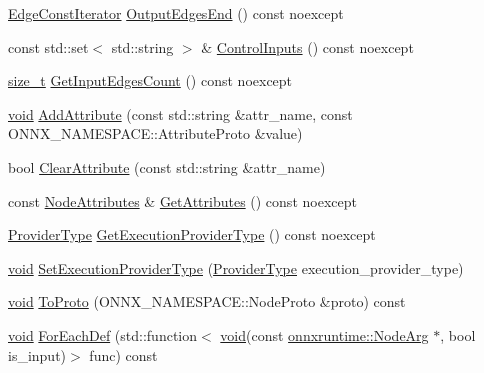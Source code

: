 \begin{DoxyCompactItemize}
\item 
\mbox{\hyperlink{classonnxruntime_1_1Node_ae0df52e26b0237505b6a0cbc25106d9d}{Edge\+Const\+Iterator}} \mbox{\hyperlink{classonnxruntime_1_1Node_afcbfde06c0db5ae3a174676e5c5dfa6d}{Output\+Edges\+End}} () const noexcept
\item 
const std\+::set$<$ std\+::string $>$ \& \mbox{\hyperlink{classonnxruntime_1_1Node_a0474e6c8bbef04b6de22f439378884d2}{Control\+Inputs}} () const noexcept
\item 
\mbox{\hyperlink{mlasi_8h_a503efbc1c6e50825320ad909366b78ab}{size\+\_\+t}} \mbox{\hyperlink{classonnxruntime_1_1Node_a2e3c899f2819a7ffa126e3b62abab3f4}{Get\+Input\+Edges\+Count}} () const noexcept
\item 
\mbox{\hyperlink{mlasi_8h_a88f941d423cb2a819b70a1358982b1a6}{void}} \mbox{\hyperlink{classonnxruntime_1_1Node_a247115035e61ce00df1fa7389d11e6eb}{Add\+Attribute}} (const std\+::string \&attr\+\_\+name, const O\+N\+N\+X\+\_\+\+N\+A\+M\+E\+S\+P\+A\+C\+E\+::\+Attribute\+Proto \&value)
\item 
bool \mbox{\hyperlink{classonnxruntime_1_1Node_aef841ccf82587a2eb4170aa52917e27b}{Clear\+Attribute}} (const std\+::string \&attr\+\_\+name)
\item 
const \mbox{\hyperlink{namespaceonnxruntime_a7fa616c461850e300cfa552afd46eed4}{Node\+Attributes}} \& \mbox{\hyperlink{classonnxruntime_1_1Node_aa90b8e7a87ff750bf9c6fcc652a654d8}{Get\+Attributes}} () const noexcept
\item 
\mbox{\hyperlink{namespaceonnxruntime_a863e2227cbf32aab76aad35fdadff4bb}{Provider\+Type}} \mbox{\hyperlink{classonnxruntime_1_1Node_aea516a6bafb57be8a8497b2f45c307e5}{Get\+Execution\+Provider\+Type}} () const noexcept
\item 
\mbox{\hyperlink{mlasi_8h_a88f941d423cb2a819b70a1358982b1a6}{void}} \mbox{\hyperlink{classonnxruntime_1_1Node_ab323d8e3bd4d5595730bcd6eb9fab760}{Set\+Execution\+Provider\+Type}} (\mbox{\hyperlink{namespaceonnxruntime_a863e2227cbf32aab76aad35fdadff4bb}{Provider\+Type}} execution\+\_\+provider\+\_\+type)
\item 
\mbox{\hyperlink{mlasi_8h_a88f941d423cb2a819b70a1358982b1a6}{void}} \mbox{\hyperlink{classonnxruntime_1_1Node_ab7674297b124b064d0bee3fc56d1e29c}{To\+Proto}} (O\+N\+N\+X\+\_\+\+N\+A\+M\+E\+S\+P\+A\+C\+E\+::\+Node\+Proto \&proto) const
\item 
\mbox{\hyperlink{mlasi_8h_a88f941d423cb2a819b70a1358982b1a6}{void}} \mbox{\hyperlink{classonnxruntime_1_1Node_aa5b858528fbdf2d3e4f3d4bda024c820}{For\+Each\+Def}} (std\+::function$<$ \mbox{\hyperlink{mlasi_8h_a88f941d423cb2a819b70a1358982b1a6}{void}}(const \mbox{\hyperlink{classonnxruntime_1_1NodeArg}{onnxruntime\+::\+Node\+Arg}} $\ast$, bool is\+\_\+input)$>$ func) const

\end{DoxyCompactItemize}
